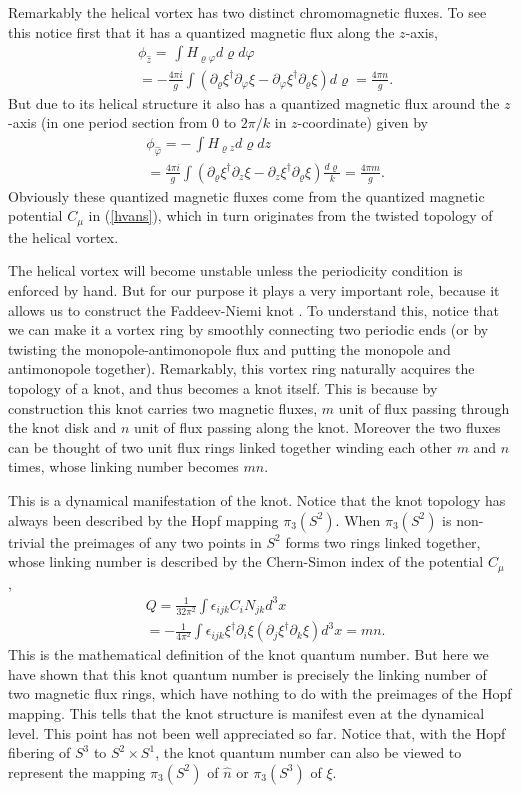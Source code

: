 \documentclass[twocolumn,showpacs,showkeys]{revtex4}
\newcommand{\bea}{\begin{eqnarray}}
\newcommand{\eea}{\end{eqnarray}}
\newcommand{\dfrac}{\displaystyle\frac}
\newcommand{\nn}{\nonumber}
\newcommand{\hn}{\hat n}
\begin{document}
Remarkably the helical vortex has two distinct
chromomagnetic fluxes. To see this notice first that it has
a quantized magnetic flux along the $z$-axis,
\bea
&\phi_{\hat z} = \dfrac {}{}\int H_{\varrho\varphi} d\varrho d\varphi \nn\\
& = -\dfrac {4\pi i}{g} \int (\partial_{\varrho} \xi^{\dagger}
\partial_{\varphi} \xi - \partial_{\varphi} \xi^{\dagger}
\partial_{\varrho} \xi) d\varrho = \dfrac{4\pi n}{g}.
\label{nqn}
\eea
But due to its helical structure it also has
a quantized magnetic flux around the $z$-axis (in
one period section from $0$ to $2\pi/k$ in $z$-coordinate) given by
\bea
&\phi_{\hat \varphi} = -\dfrac {}{}\int H_{\varrho z} d\varrho dz \nn\\
&= \dfrac {4\pi i}{g} \int (\partial_{\varrho} \xi^{\dagger}
\partial_z \xi - \partial_z \xi^{\dagger}
\partial_{\varrho} \xi) \dfrac{d\varrho}{k} = \dfrac{4\pi m}{g}.
\label{mqn}
\eea
Obviously these quantized magnetic fluxes come from the
quantized magnetic potential $C_\mu$ in (\ref{hvans}), which in turn
originates from the twisted topology of the helical vortex.

The helical vortex will become
unstable unless the periodicity condition is enforced by
hand. But for our purpose it plays a very important role,
because it allows us to construct the Faddeev-Niemi
knot \cite{cho01,cho1}. To understand this, notice that we can make it
a vortex ring by smoothly connecting
two periodic ends (or by twisting the monopole-antimonopole
flux and putting the monopole and antimonopole together).
Remarkably, this vortex ring naturally
acquires the topology of a knot, and thus becomes a knot itself.
This is because
by construction this knot carries two magnetic fluxes,
$m$ unit of flux passing through the knot disk
and $n$ unit of flux passing along the knot.
Moreover the two fluxes can be thought of two unit flux rings
linked together winding each other $m$ and $n$ times,
whose linking number becomes $mn$. 

This is a dynamical manifestation of the knot. Notice that the knot 
topology has always been described by the Hopf mapping 
$\pi_3(S^2)$. When $\pi_3(S^2)$ is non-trivial the preimages 
of any two points in $S^2$ forms two rings linked together, 
whose linking number is described by 
the Chern-Simon index of the potential $C_\mu$ \cite{fadd1},
\bea
&Q = \dfrac{1}{32\pi^2} \int \epsilon_{ijk} C_i N_{jk} d^3x \nn\\
&= - \dfrac {1}{4\pi^2} \int \epsilon_{ijk} \xi^{\dagger}
\partial_i \xi ( \partial_j \xi^{\dagger}
\partial_k \xi ) d^3 x = mn.
\label{kqn}
\eea
This is the mathematical definition of the knot quantum number.
But here we have shown that this knot quantum number
is precisely the linking number of two magnetic flux rings,
which have nothing to do with the preimages of the Hopf
mapping. This tells that the knot structure is manifest even at 
the dynamical level. This point has not been well appreciated so far. 
Notice that, with the Hopf fibering of $S^3$ to
$S^2 \times S^1$, the knot quantum number
can also be viewed to represent the mapping $\pi_3(S^2)$ of $\hn$
or $\pi_3(S^3)$ of $\xi$.
\end{document}
